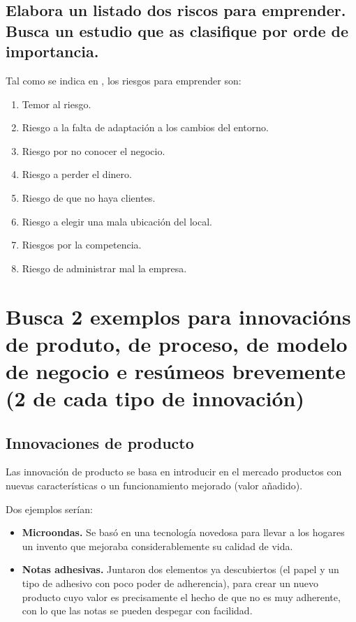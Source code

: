 \documentclass[a4paper]{article}
\begin{document}
\subsection{Elabora un listado dos riscos para emprender. Busca un estudio que as clasifique por orde de importancia.}

Tal como se indica en \cite{RefWorks:doc:603013bc8f086330fc6bf68f}, los riesgos para emprender son:

\begin{enumerate}
    \item Temor al riesgo.
    \item Riesgo a la falta de adaptación a los cambios del entorno.
    \item Riesgo por no conocer el negocio.
    \item Riesgo a perder el dinero.
    \item Riesgo de que no haya clientes.
    \item Riesgo a elegir una mala ubicación del local.
    \item Riesgos por la competencia.
    \item Riesgo de administrar mal la empresa.
\end{enumerate}

\section{Busca 2 exemplos para innovacións de produto, de proceso, de modelo de negocio e resúmeos brevemente (2 de cada tipo de innovación)}

\subsection{Innovaciones de producto}
Las innovación de producto se basa en introducir en el mercado productos con nuevas características o un funcionamiento mejorado (valor añadido).

Dos ejemplos serían:
\begin{itemize}
    \item \textbf{Microondas.} Se basó en una tecnología novedosa para llevar a los hogares un invento que mejoraba considerablemente su calidad de vida.
    \item \textbf{Notas adhesivas.} Juntaron dos elementos ya descubiertos (el papel y un tipo de adhesivo con poco poder de adherencia), para crear un nuevo producto cuyo valor es precisamente el hecho de que no es muy adherente, con lo que las notas se pueden despegar con facilidad.
\end{itemize}
\end{document}
